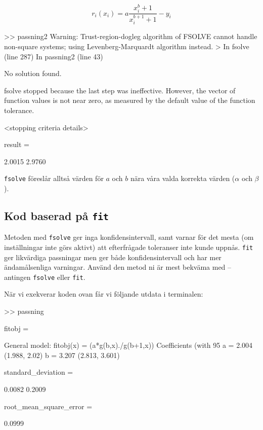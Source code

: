 \begin{equation}
  \label{eq:ex}
  r_i(x_i) = a\frac{x_i^b+1}{x_i^{b+1}+1} - y_i
\end{equation}


\begin{terminaloutput}
>> passning2
Warning: Trust-region-dogleg algorithm of FSOLVE cannot handle non-square systems; using Levenberg-Marquardt algorithm instead. 
> In fsolve (line 287)
  In passning2 (line 43) 

No solution found.

fsolve stopped because the last step was ineffective. However, the vector of function
values is not near zero, as measured by the default value of the function tolerance. 

<stopping criteria details>


result =

    2.0015    2.9760
\end{terminaloutput}
{\tt fsolve} föreslår alltså värden för $a$ och $b$ nära våra valda
korrekta värden ($\alpha$ och $\beta$).

\subsection{Kod baserad på {\tt fit}}
\label{sec:matlab-fit}
Metoden med {\tt fsolve} ger inga konfidensintervall, 
samt varnar för det mesta (om inställningar inte
görs aktivt) att efterfrågade toleranser inte kunde uppnås.
{\tt fit} ger likvärdiga passningar men ger både konfidensintervall och
har mer ändamålsenliga varningar. Använd den metod ni är mest bekväma med
-- antingen {\tt fsolve} eller {\tt fit}.


När vi exekverar koden ovan får vi följande utdata i terminalen:

\begin{terminaloutput}
>> passning

fitobj = 

     General model:
     fitobj(x) = (a*g(b,x)./g(b+1,x))
     Coefficients (with 95%
       a =       2.004  (1.988, 2.02)
       b =       3.207  (2.813, 3.601)

standard_deviation =

    0.0082    0.2009


root_mean_square_error =

    0.0999
\end{terminaloutput}

